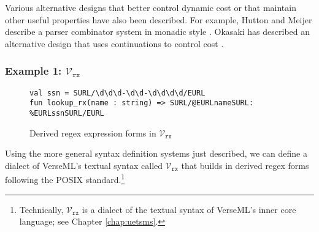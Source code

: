 Various alternative designs that better control dynamic cost or that maintain other useful properties have also been described. For example, Hutton and Meijer describe a parser combinator system in monadic style \cite{hutton1998monadic}. Okasaki has described an alternative design that uses continuations to control cost \cite{Okasaki98b}.



\subsubsection{Example 1: $\mathcal{V}_\texttt{rx}$}
\begin{figure}
\begin{lstlisting}[numbers=none]
val ssn = SURL/\d\d\d-\d\d-\d\d\d\d/EURL
fun lookup_rx(name : string) => SURL/@EURLnameSURL: %EURLssnSURL/EURL
\end{lstlisting}
\caption{Derived regex expression forms in $\mathcal{V}_\texttt{rx}$}
\label{fig:derived-spliced-subexpressions}
\end{figure}
Using the more general syntax definition systems just described, we can define a dialect of VerseML's textual syntax called  $\mathcal{V}_\texttt{rx}$ that builds in derived regex forms following the POSIX standard.\footnote{Technically, $\mathcal{V}_\texttt{rx}$ is a dialect of the textual syntax of VerseML's inner core language; see Chapter \ref{chap:uetsms}.} 

